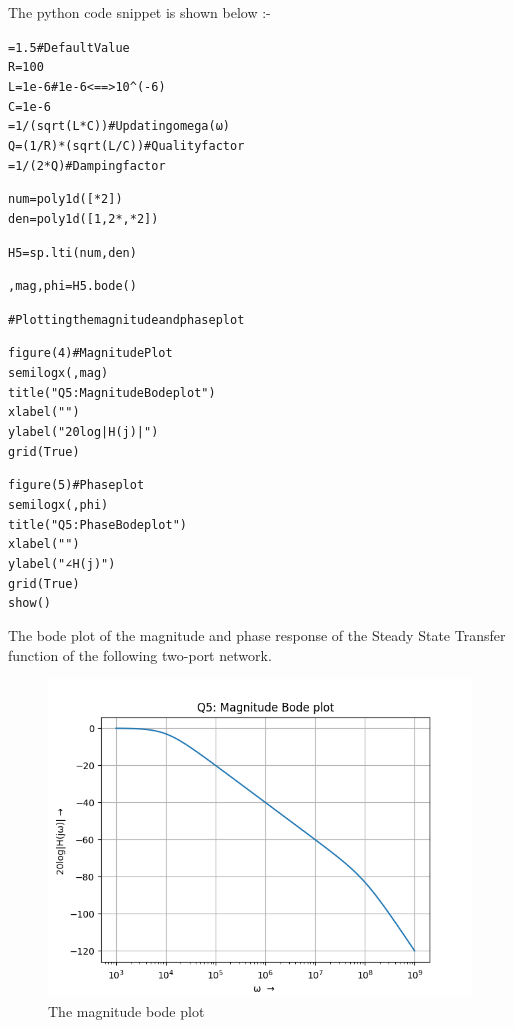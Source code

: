 \documentclass[11pt, a4paper]{article}
\begin{document}
The python code snippet is shown below :-
\begin{alltt}
\omega = 1.5 # Default Value
R = 100 
L = 1e-6 # 1e-6 <==> 10^(-6)
C = 1e-6
\omega = 1/(sqrt(L * C)) # Updating omega(ω)
Q = (1/R) * (sqrt(L/C)) # Quality factor 
\zeta = 1/(2 * Q) # Damping factor

num = poly1d([\omega**2])
den = poly1d([1, 2*\omega*\zeta, \omega**2])

H5 = sp.lti(num, den)

\omega, mag, phi = H5.bode()

# Plotting the magnitude and phase plot

figure(4) # Magnitude Plot
semilogx(\omega, mag)
title("Q5: Magnitude Bode plot")
xlabel("\omega  \rightarrow ")
ylabel("20log|H(j\omega)| \rightarrow ")
grid(True)

figure(5) # Phase plot
semilogx(\omega, phi)
title("Q5: Phase Bode plot")
xlabel("\omega  \rightarrow ")
ylabel("∠H(j\omega) \rightarrow ")
grid(True)
show()
\end{alltt}

The bode plot of the magnitude and phase response of the Steady State Transfer function of the following two-port network.

\begin{figure}[!tbh]
 \centering
 \includegraphics[scale=0.6]{Ass6_Figure_4.png}  
 \caption{The magnitude bode plot}
\end{figure}
\end{document}
